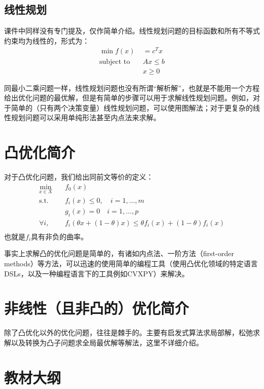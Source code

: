 \documentclass[12pt,a4paper]{book}
\begin{document}
\subsection{线性规划}
课件中同样没有专门提及，仅作简单介绍。线性规划问题的目标函数和所有不等式约束均为线性的，形式为：
\begin{align*}
\min f(x) &= c^Tx \\
\text{subject to} \quad & Ax \leq b \\
& x \geq 0
\end{align*}

同最小二乘问题一样，线性规划问题也没有所谓“解析解”，也就是不能用一个方程给出优化问题的最优解，但是有简单的步骤可以用于求解线性规划问题。例如，对于简单的（只有两个决策变量）线性规划问题，可以使用图解法；对于更复杂的线性规划问题可以采用单纯形法甚至内点法来求解。

\section{凸优化简介}

对于凸优化问题，我们给出同前文等价的定义：
\begin{align*}
\min_{x \in X} \quad &f_0(x) \\
\text{s.t.} \quad &f_i(x) \leq 0 ,\quad i = 1, \ldots, m \\
& g_i(x) = 0 \quad i = 1, \ldots, p \\
\forall i, \quad & f_i(\theta x + (1 - \theta)x) \leq \theta f_i(x) + (1 - \theta) f_i(x)  \\
\end{align*}
也就是$f_i$具有非负的曲率。

事实上求解凸的优化问题是简单的，有诸如内点法、一阶方法（first-order methods）等方法，可以迅速的使用简单的编程工具（使用凸优化领域的特定语言DSLs，以及一种编程语言下的工具例如CVXPY）来解决。



\section{非线性（且非凸的）优化简介}

除了凸优化以外的优化问题，往往是棘手的。主要有启发式算法求局部解，松弛求解以及转换为凸子问题求全局最优解等解法，这里不详细介绍。

\section{教材大纲}
\end{document}
